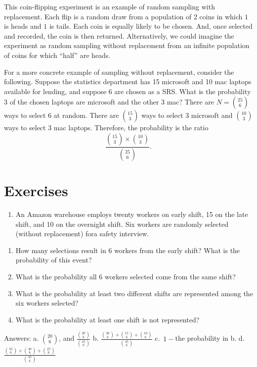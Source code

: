 \documentclass[
]{book}
\providecommand{\tightlist}{%
  \setlength{\itemsep}{0pt}\setlength{\parskip}{0pt}}
\begin{document}
This coin-flipping experiment is an example of random sampling with replacement. Each flip is a random draw from a population of \(2\) coins in which \(1\) is heads and \(1\) is tails. Each coin is equally likely to be chosen. And, once selected and recorded, the coin is then returned. Alternatively, we could imagine the experiment as random sampling without replacement from an infinite population of coins for which ``half'' are heads.

For a more concrete example of sampling without replacement, consider the following. Suppose the statistics department has 15 microsoft and 10 mac laptops available for lending, and suppose 6 are chosen as a SRS. What is the probability 3 of the chosen laptops are microsoft and the other 3 mac? There are \(N = {25 \choose 6}\) ways to select 6 at random. There are \({15 \choose 3}\) ways to select 3 microsoft and \({10 \choose 3}\) ways to select \(3\) mac laptops. Therefore, the probability is the ratio
\[\frac{{15 \choose 3}\times {10 \choose 3}}{{25 \choose 6}}.\]

\hypertarget{exercises-1}{%
\section{Exercises}\label{exercises-1}}

\begin{enumerate}
\def\labelenumi{\arabic{enumi}.}
\tightlist
\item
  An Amazon warehouse employs twenty workers on early shift, 15 on the late shift, and 10 on the overnight shift. Six workers are randomly selected (without replacement) fora safety interview.
\end{enumerate}

\begin{enumerate}
\def\labelenumi{\alph{enumi}.}
\tightlist
\item
  How many selections result in 6 workers from the early shift? What is the probability of this event?
\item
  What is the probability all 6 workers selected come from the same shift?
\item
  What is the probability at least two different shifts are represented among the six workers selected?
\item
  What is the probability at least one shift is not represented?
\end{enumerate}

Answers:
a. \({20 \choose 6}\), and \(\frac{{20 \choose 6}}{{45 \choose 6}}\)
b. \(\frac{{20 \choose 6}+{15 \choose 6}+{10 \choose 6}}{{45 \choose 6}}\)
c.~\(1-\)the probability in b.
d.~\(\frac{{35 \choose 6}+{30 \choose 6}+{25 \choose 6}}{{45 \choose 6}}\)
\end{document}
